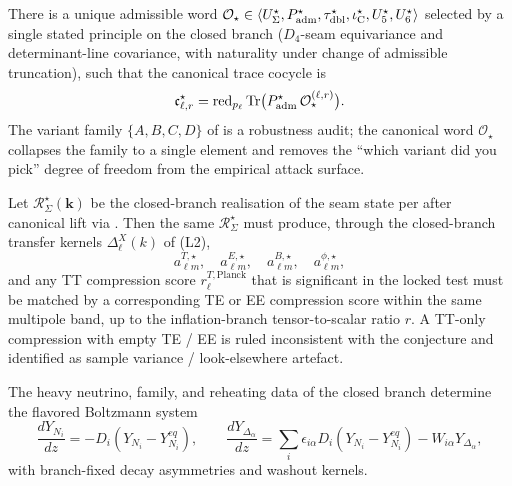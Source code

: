 \begin{conjecture}
\label{conj:canonical-trace-word}
There is a unique admissible word
$\mathcal O_\star\in\langle U_\Sigma^\star,P_{\mathrm{adm}}^\star,\tau_{\mathrm{dbl}}^\star,\iota_{\mathrm C}^\star,U_5^\star,U_6^\star\rangle$
selected by a single stated principle on the closed branch ($D_4$-seam equivariance and
determinant-line covariance, with naturality under change of admissible truncation), such that the
canonical trace cocycle is
\[
\mathfrak c_{\ell,r}^\star
=
\operatorname{red}_{p_\ell}\operatorname{Tr}\bigl(P_{\mathrm{adm}}^\star\,\mathcal O_\star^{(\ell,r)}\bigr).
\]
The variant family $\{A,B,C,D\}$ of  is a robustness audit; the
canonical word $\mathcal O_\star$ collapses the family to a single element and removes the
``which variant did you pick'' degree of freedom from the empirical attack surface.
\end{conjecture}

\begin{conjecture}
\label{conj:polarisation-cross-check}
Let $\mathcal R_\Sigma^\star(\mathbf k)$ be the closed-branch realisation of the seam state per
 after canonical lift via
. Then the same $\mathcal R_\Sigma^\star$
must produce, through the closed-branch transfer kernels $\Delta_\ell^X(k)$ of (L2),
\[
a_{\ell m}^{T,\star},\quad
a_{\ell m}^{E,\star},\quad
a_{\ell m}^{B,\star},\quad
a_{\ell m}^{\phi,\star},
\]
and any TT compression score $r_\ell^{T,\mathrm{Planck}}$ that is significant in the locked test
must be matched by a corresponding TE or EE compression score within the same multipole band, up
to the inflation-branch tensor-to-scalar ratio $r$. A TT-only compression with empty TE / EE is
ruled inconsistent with the conjecture and identified as sample variance / look-elsewhere
artefact.
\end{conjecture}

\begin{conjecture}
\label{thm:flavored_boltzmann_closure_baryogenesis}
The heavy neutrino, family, and reheating data of the closed branch determine the flavored
Boltzmann system
\[
\frac{dY_{N_i}}{dz}=-D_i(Y_{N_i}-Y_{N_i}^{eq}),
\qquad
\frac{dY_{\Delta_\alpha}}{dz}
=
\sum_i \epsilon_{i\alpha}D_i(Y_{N_i}-Y_{N_i}^{eq})-W_{i\alpha}Y_{\Delta_\alpha},
\]
with branch-fixed decay asymmetries and washout kernels.
\end{conjecture}

